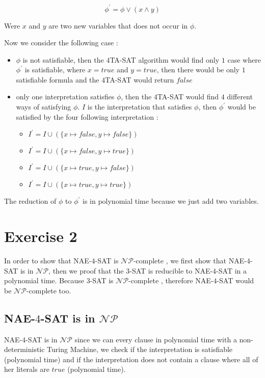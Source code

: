 \documentclass[a4paper,11pt]{report}
\newcommand*{\NPc}{$\mathcal{NP}$}
\newcommand*{\NPcp}{$\mathcal{NP}$-complete }
\newcommand*{\N}{NAE-$4$-SAT }
\begin{document}
\[
  \phi^\prime = \phi \vee (x \wedge y)
\]

Were $x$ and $y$ are two new variables that does not occur in $\phi$.

Now we consider the following case :
\begin{itemize}
\item $\phi$ is not satisfiable, then the $4$TA-SAT algorithm would find only
  $1$ case where $\phi^\prime$ is satisfiable, where $x = true$ and $y = true$,
  then there would be only $1$ satisfiable formula and the $4$TA-SAT would
  return $false$
\item only one interpretation satisfies $\phi$, then the $4$TA-SAT would find
  $4$ different ways of satisfying $\phi$. $I$ is the interpretation that
  satisfies $\phi$, then $\phi^\prime$ would be satisfied by the four following
  interpretation :
  \begin{itemize}
  \item $I^\prime = I \cup (\{x \mapsto false, y \mapsto false\})$
  \item $I^\prime = I \cup (\{x \mapsto false, y \mapsto true\})$
  \item $I^\prime = I \cup (\{x \mapsto true, y \mapsto false\})$
  \item $I^\prime = I \cup (\{x \mapsto true, y \mapsto true\})$
  \end{itemize}
\end{itemize}

The reduction of $\phi$ to $\phi^\prime$ is in polynomial time because we just
add two variables.

\section*{Exercise 2}

In order to show that \N is \NPcp, we first show that \N is in \NPc, then we
proof that the $3$-SAT is reducible to \N in a polynomial time. Because $3$-SAT
is \NPcp, therefore \N would be \NPcp too.

\subsection*{\N is in $\mathcal{NP}$}

\N is in $\mathcal{NP}$ since we can every clause in polynomial time with a 
non-deterministic Turing Machine, we check if the interpretation is satisfiable
(polynomial time) and if the interpretation does not contain a clause where all
of her literals are $true$ (polynomial time).
\end{document}
